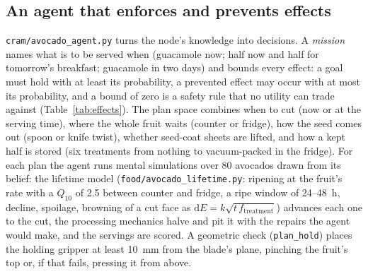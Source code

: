 \documentclass[10.5pt,a4paper]{article}
\begin{document}
\subsection{An agent that enforces and prevents effects}
\texttt{cram/avocado\_agent.py} turns the node's knowledge into decisions. A \emph{mission} names what is to be
served when (guacamole now; half now and half for tomorrow's breakfast; guacamole in two days) and bounds every
effect: a goal must hold with at least its probability, a prevented effect may occur with at most its probability,
and a bound of zero is a safety rule that no utility can trade against (Table~\ref{tab:effects}). The plan space
combines when to cut (now or at the serving time), where the whole fruit waits (counter or fridge), how the seed comes
out (spoon or knife twist), whether seed-coat sheets are lifted, and how a kept half is stored (six treatments from
nothing to vacuum-packed in the fridge). For each plan the agent runs mental simulations over 80 avocados drawn from
its belief: the lifetime model (\texttt{food/avocado\_lifetime.py}: ripening at the fruit's rate with a $Q_{10}$ of
2.5 between counter and fridge, a ripe window of 24--48~h, decline, spoilage, browning of a cut face as
$\mathrm{d}E=k\sqrt{t\,f_\text{treatment}}$) advances each one to the cut, the processing mechanics halve and pit it
with the repairs the agent would make, and the servings are scored. A geometric check (\texttt{plan\_hold}) places
the holding gripper at least 10~mm from the blade's plane, pinching the fruit's top or, if that fails, pressing it
from above.
\end{document}
